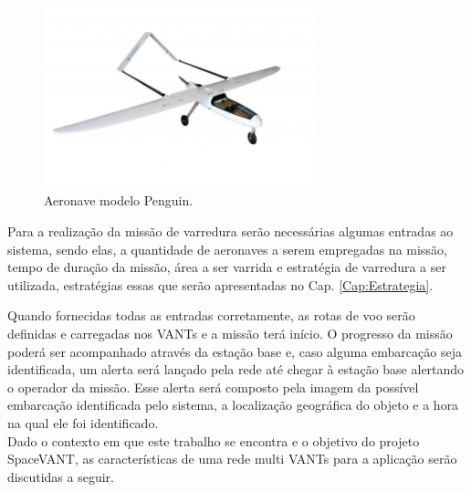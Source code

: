 \begin{figure} 
\center
\includegraphics[width=0.7\textwidth]{penguin.jpg}
\caption{Aeronave modelo Penguin.} 
\label{fig:penguin}
\end{figure}

Para a realização da missão de varredura serão necessárias algumas entradas ao sistema, sendo elas, a quantidade de aeronaves a serem empregadas na missão, tempo de duração da missão, área a ser varrida e estratégia de varredura a ser utilizada, estratégias essas que serão apresentadas no Cap. \ref{Cap:Estrategia}.

Quando fornecidas todas as entradas corretamente, as rotas de voo serão definidas e carregadas nos VANTs e a missão terá início. O progresso da missão poderá ser acompanhado através da estação base e, caso alguma embarcação seja identificada, um alerta será lançado pela rede até chegar à estação base alertando o operador da missão. Esse alerta será composto pela imagem da possível embarcação identificada pelo sistema, a localização geográfica do objeto e a hora na qual ele foi identificado.\\  

Dado o contexto em que este trabalho se encontra e o objetivo do projeto SpaceVANT, as características de uma rede multi VANTs para a aplicação serão discutidas a seguir.





 